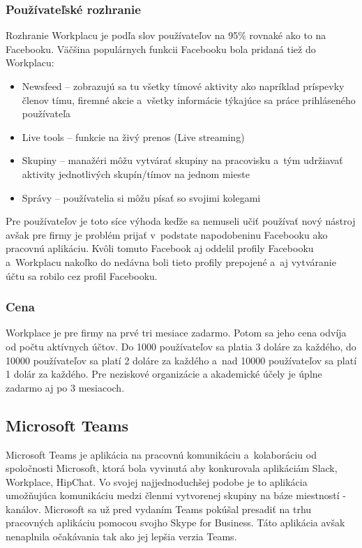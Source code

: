 \subsubsection{Používateľské rozhranie}
\indent Rozhranie Workplacu je podľa slov používateľov na 95\% rovnaké ako to na Facebooku. Väčšina populárnych funkcii Facebooku bola pridaná tiež do Workplacu:
\begin{itemize}
    \item Newsfeed – zobrazujú sa tu všetky tímové aktivity ako napríklad príspevky členov tímu, firemné akcie a všetky informácie týkajúce sa práce prihláseného používateľa
    \item Live tools – funkcie na živý prenos (Live streaming)
    \item Skupiny – manažéri môžu vytvárať skupiny na pracovisku a tým udržiavať aktivity jednotlivých skupín/tímov na jednom  mieste
    \item Správy – používatelia si môžu písať so svojimi kolegami
\end{itemize}

\indent Pre používateľov je toto síce výhoda keďže sa nemuseli učiť používať nový nástroj avšak pre firmy je problém prijať v podstate napodobeninu Facebooku ako pracovnú aplikáciu. Kvôli tomuto Facebook aj oddelil profily Facebooku a Workplacu nakoľko do nedávna boli tieto profily prepojené a aj vytváranie účtu sa robilo cez profil Facebooku. 
\subsubsection{Cena}
\indent Workplace je pre firmy na prvé tri mesiace zadarmo. Potom sa jeho cena odvíja od počtu aktívnych účtov. Do 1000 používateľov sa platia 3 doláre za každého, do 10000 používateľov sa platí 2 doláre za každého a nad 10000 používateľov sa platí 1 dolár za každého.  Pre neziskové organizácie a akademické účely je úplne zadarmo aj po 3 mesiacoch.

\subsection{Microsoft Teams}
\indent Microsoft Teams je aplikácia na pracovnú komunikáciu a kolaboráciu od spoločnosti Microsoft, ktorá bola vyvinutá aby konkurovala aplikáciám Slack, Workplace, HipChat. Vo svojej najjednoduchšej podobe je to aplikácia umožňujúca komunikáciu medzi členmi vytvorenej skupiny na báze miestností - kanálov. Microsoft sa už pred vydaním Teams pokúšal presadiť na trhu pracovných aplikáciu pomocou svojho Skype for Business. Táto aplikácia avšak nenaplnila očakávania tak ako jej lepšia verzia Teams. 
